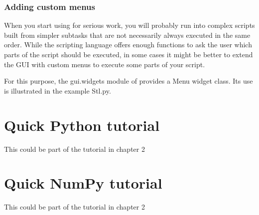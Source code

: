 \subsubsection{Adding custom menus}
\label{sec:adding-custom-menus}

When you start using \pyformex for serious work, you will probably run into complex scripts built from simpler subtasks that are not necessarily always executed in the same order. While the \pyformex scripting language offers enough functions to ask the user which parts of the script should be executed, in some cases it might be better to extend the \pyformex GUI with custom menus to execute some parts of your script.

For this purpose, the gui.widgets module of \pyformex provides a Menu widget class. Its use is illustrated in the example Stl.py.


\section{Quick {Python tutorial}}
\label{sec:python-tutorial}
This could be part of the tutorial in chapter 2

\section{Quick NumPy tutorial}
\label{sec:numpy-tutorial}
This could be part of the tutorial in chapter 2

